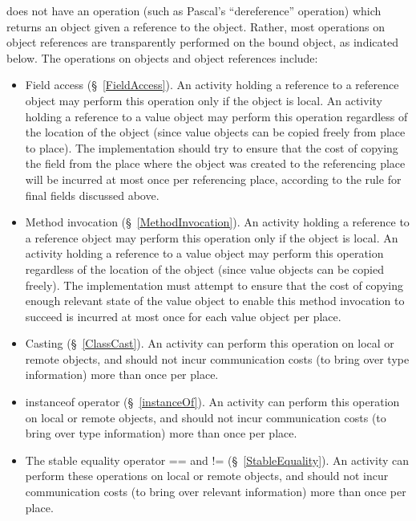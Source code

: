 {}\Xten{} does not have an operation (such as Pascal's ``dereference''
operation) which returns an object given a reference to the
object. Rather, most operations on object references are transparently
performed on the bound object, as indicated below. The operations on
objects and object references include:
\begin{itemize}

{}\item Field access (\S~\ref{FieldAccess}). An activity holding a
reference to a reference object may perform this operation only if the
object is local.  An activity holding a reference to a value object
may perform this operation regardless of the location of the object
(since value objects can be copied freely from place to place).  The
implementation should try to ensure that the cost of copying the field
from the place where the object was created to the referencing place
will be incurred at most once per referencing place, according to the
rule for final fields discussed above.

\item Method invocation (\S~\ref{MethodInvocation}).  An activity
holding a reference to a reference object may perform this operation
only if the object is local.  An activity holding a reference to a
value object may perform this operation regardless of the location of
the object (since value objects can be copied freely). The \Xten{}
implementation must attempt to ensure that the cost of copying enough
relevant state of the value object to enable this method invocation to
succeed is incurred at most once for each value object per place.

{}\item Casting (\S~\ref{ClassCast}).  An activity can perform this
operation on local or remote objects, and should not incur
communication costs (to bring over type information) more than once
per place.

{}\item {\cf instanceof} operator (\S~\ref{instanceOf}).  An activity
can perform this operation on local or remote objects, and should not
incur communication costs (to bring over type information) more than
once per place.

\item The stable equality operator {\cf ==} and {\cf !=}
(\S~\ref{StableEquality}). An activity can perform these operations on
local or remote objects, and should not incur communication costs
(to bring over relevant information) more than once per place.

\end{itemize}

